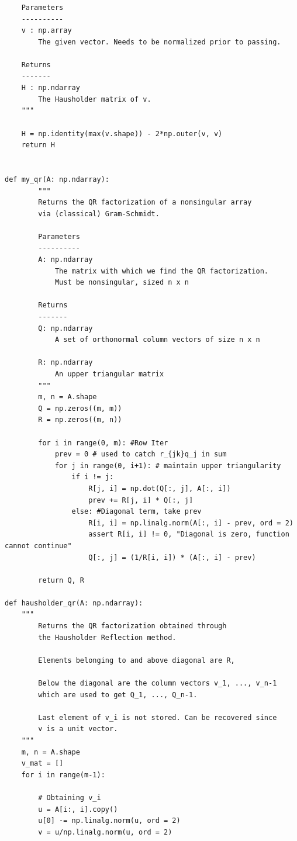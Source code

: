 \begin{solution}
\begin{lstlisting}
    Parameters
    ----------
    v : np.array
        The given vector. Needs to be normalized prior to passing.
        
    Returns
    -------
    H : np.ndarray
        The Hausholder matrix of v.
    """
    
    H = np.identity(max(v.shape)) - 2*np.outer(v, v)
    return H


def my_qr(A: np.ndarray):
        """
        Returns the QR factorization of a nonsingular array
        via (classical) Gram-Schmidt.

        Parameters
        ----------
        A: np.ndarray
            The matrix with which we find the QR factorization.
            Must be nonsingular, sized n x n

        Returns
        -------
        Q: np.ndarray
            A set of orthonormal column vectors of size n x n

        R: np.ndarray
            An upper triangular matrix
        """
        m, n = A.shape
        Q = np.zeros((m, m))
        R = np.zeros((m, n))

        for i in range(0, m): #Row Iter
            prev = 0 # used to catch r_{jk}q_j in sum
            for j in range(0, i+1): # maintain upper triangularity
                if i != j:
                    R[j, i] = np.dot(Q[:, j], A[:, i])
                    prev += R[j, i] * Q[:, j]
                else: #Diagonal term, take prev
                    R[i, i] = np.linalg.norm(A[:, i] - prev, ord = 2)
                    assert R[i, i] != 0, "Diagonal is zero, function cannot continue"
                    Q[:, j] = (1/R[i, i]) * (A[:, i] - prev)
    
        return Q, R
    
def hausholder_qr(A: np.ndarray):
    """
        Returns the QR factorization obtained through 
        the Hausholder Reflection method. 
        
        Elements belonging to and above diagonal are R, 
        
        Below the diagonal are the column vectors v_1, ..., v_n-1
        which are used to get Q_1, ..., Q_n-1. 
        
        Last element of v_i is not stored. Can be recovered since 
        v is a unit vector.
    """
    m, n = A.shape
    v_mat = []
    for i in range(m-1):
        
        # Obtaining v_i
        u = A[i:, i].copy()
        u[0] -= np.linalg.norm(u, ord = 2)
        v = u/np.linalg.norm(u, ord = 2)
        

\end{lstlisting}
\end{solution}
